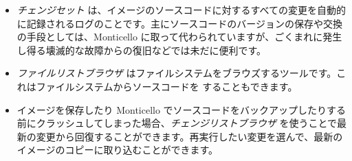\documentclass[a4paper,10pt,twoside]{book}
\begin{document}
\begin{itemize}
  \item \emph{チェンジセット} は、イメージのソースコードに対するすべての変更を自動的に記録されるログのことです。主にソースコードのバージョンの保存や交換の手段としては、Monticello に取って代わられていますが、ごくまれに発生し得る壊滅的な故障からの復旧などでは未だに便利です。
  \item \emph{ファイルリストブラウザ} はファイルシステムをブラウズするツールです。これはファイルシステムからソースコードを  することもできます。
  \item イメージを保存したり Monticello でソースコードをバックアップしたりする前にクラッシュしてしまった場合、\emph{チェンジリストブラウザ} を使うことで最新の変更から回復することができます。再実行したい変更を選んで、最新のイメージのコピーに取り込むことができます。
\end{itemize}

\ifx\wholebook\relax\else
\end{document}
